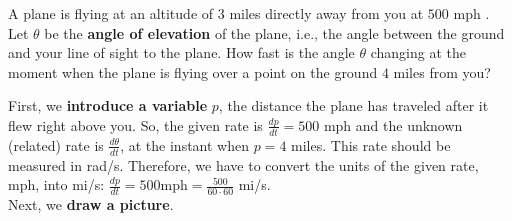 \documentclass{ximera}
\begin{document}
\author{Nela Lakos}
\begin{example}
A plane is flying at an altitude of $3$ miles directly away from you at $500$ mph 
.  Let  $\theta$ be the \textbf{angle of elevation} of the plane, i.e., the angle between the ground and your line of  sight to the plane.
How fast is the angle $\theta$  changing at
the moment when the plane is flying over a point on the ground $4$
miles from you?


\begin{explanation}
 First, we \textbf{introduce a variable} $p$, the distance the plane has traveled after it flew right above you. 
 So, the given rate is $\frac{dp}{dt}=500$ mph and the unknown (related) rate is $\frac{d\theta}{dt}$, at the instant when $p=4$ miles.
  This rate should be measured in rad/s.
  Therefore, we have to convert the units of the given rate, mph, into mi/s:
    $\frac{dp}{dt}=500$mph$=\frac{500}{60\cdot60}$ mi/s. \\
Next, we \textbf{draw a picture}.
\begin{image}
\end{image}
\end{explanation}
\end{example}
\end{document}
